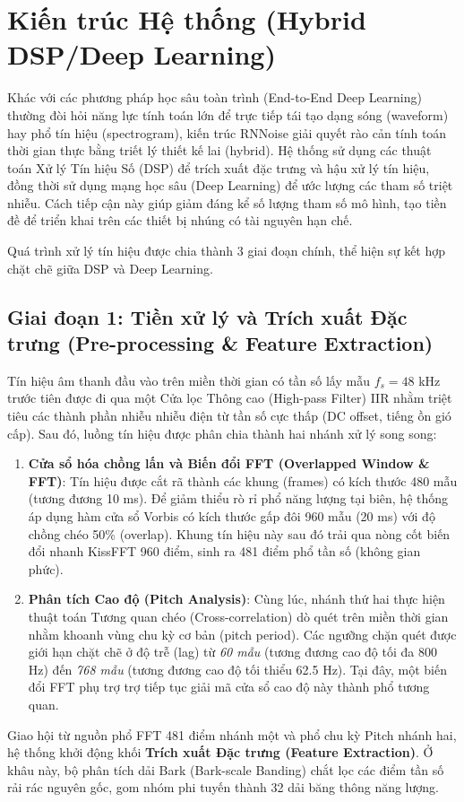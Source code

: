 \section{Kiến trúc Hệ thống (Hybrid DSP/Deep Learning)}

Khác với các phương pháp học sâu toàn trình (End-to-End Deep Learning) thường đòi hỏi năng lực tính toán lớn để trực tiếp tái tạo dạng sóng (waveform) hay phổ tín hiệu (spectrogram), kiến trúc RNNoise \cite{valin2018hybrid} giải quyết rào cản tính toán thời gian thực bằng triết lý thiết kế lai (hybrid). Hệ thống sử dụng các thuật toán Xử lý Tín hiệu Số (DSP) để trích xuất đặc trưng và hậu xử lý tín hiệu, đồng thời sử dụng mạng học sâu (Deep Learning) để ước lượng các tham số triệt nhiễu. Cách tiếp cận này giúp giảm đáng kể số lượng tham số mô hình, tạo tiền đề để triển khai trên các thiết bị nhúng có tài nguyên hạn chế.

Quá trình xử lý tín hiệu được chia thành 3 giai đoạn chính, thể hiện sự kết hợp chặt chẽ giữa DSP và Deep Learning.

\subsection{Giai đoạn 1: Tiền xử lý và Trích xuất Đặc trưng (Pre-processing \& Feature Extraction)}
Tín hiệu âm thanh đầu vào trên miền thời gian có tần số lấy mẫu $f_s = 48$ kHz trước tiên được đi qua một Cửa lọc Thông cao (High-pass Filter) IIR nhằm triệt tiêu các thành phần nhiễu nhiễu điện từ tần số cực thấp (DC offset, tiếng ồn gió cấp). Sau đó, luồng tín hiệu được phân chia thành hai nhánh xử lý song song:
\begin{enumerate}
    \item \textbf{Cửa sổ hóa chồng lấn và Biến đổi FFT (Overlapped Window \& FFT)}: Tín hiệu được cắt rã thành các khung (frames) có kích thước 480 mẫu (tương đương 10 ms). Để giảm thiểu rò rỉ phổ năng lượng tại biên, hệ thống áp dụng hàm cửa sổ Vorbis có kích thước gấp đôi 960 mẫu (20 ms) với độ chồng chéo 50\% (overlap). Khung tín hiệu này sau đó trải qua nòng cốt biến đổi nhanh KissFFT 960 điểm, sinh ra 481 điểm phổ tần số (không gian phức).
    \item \textbf{Phân tích Cao độ (Pitch Analysis)}: Cùng lúc, nhánh thứ hai thực hiện thuật toán Tương quan chéo (Cross-correlation) dò quét trên miền thời gian nhằm khoanh vùng chu kỳ cơ bản (pitch period). Các ngưỡng chặn quét được giới hạn chặt chẽ ở độ trễ (lag) từ \textit{60 mẫu} (tương đương cao độ tối đa 800 Hz) đến \textit{768 mẫu} (tương đương cao độ tối thiểu 62.5 Hz). Tại đây, một biến đổi FFT phụ trợ trợ tiếp tục giải mã cửa sổ cao độ này thành phổ tương quan.
\end{enumerate}
Giao hội từ nguồn phổ FFT 481 điểm nhánh một và phổ chu kỳ Pitch nhánh hai, hệ thống khởi động khối \textbf{Trích xuất Đặc trưng (Feature Extraction)}. Ở khâu này, bộ phân tích dải Bark (Bark-scale Banding) chắt lọc các điểm tần số rải rác nguyên gốc, gom nhóm phi tuyến thành 32 dải băng thông năng lượng. 

